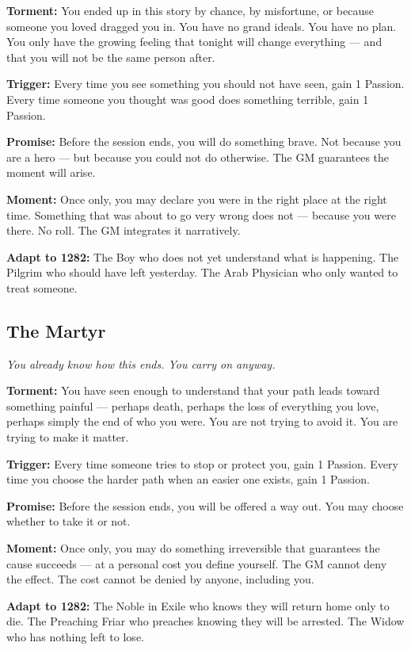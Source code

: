 \textbf{Torment:} You ended up in this story by chance, by misfortune,
or because someone you loved dragged you in. You have no grand ideals.
You have no plan. You only have the growing feeling that tonight will
change everything --- and that you will not be the same person after.

\textbf{Trigger:} Every time you see something you should not have seen,
gain 1 Passion. Every time someone you thought was good does something
terrible, gain 1 Passion.

\textbf{Promise:} Before the session ends, you will do something brave.
Not because you are a hero --- but because you could not do otherwise.
The GM guarantees the moment will arise.

\textbf{Moment:} Once only, you may declare you were in the right place
at the right time. Something that was about to go very wrong does not ---
because you were there. No roll. The GM integrates it narratively.

\textbf{Adapt to 1282:} The Boy who does not yet understand what is
happening. The Pilgrim who should have left yesterday. The Arab Physician
who only wanted to treat someone.

\filetto

\subsection{The Martyr}
\textit{You already know how this ends. You carry on anyway.}

\textbf{Torment:} You have seen enough to understand that your path leads
toward something painful --- perhaps death, perhaps the loss of everything
you love, perhaps simply the end of who you were. You are not trying to
avoid it. You are trying to make it matter.

\textbf{Trigger:} Every time someone tries to stop or protect you, gain
1 Passion. Every time you choose the harder path when an easier one
exists, gain 1 Passion.

\textbf{Promise:} Before the session ends, you will be offered a way out.
You may choose whether to take it or not.

\textbf{Moment:} Once only, you may do something irreversible that
guarantees the cause succeeds --- at a personal cost you define yourself.
The GM cannot deny the effect. The cost cannot be denied by anyone,
including you.

\textbf{Adapt to 1282:} The Noble in Exile who knows they will return
home only to die. The Preaching Friar who preaches knowing they will be
arrested. The Widow who has nothing left to lose.

